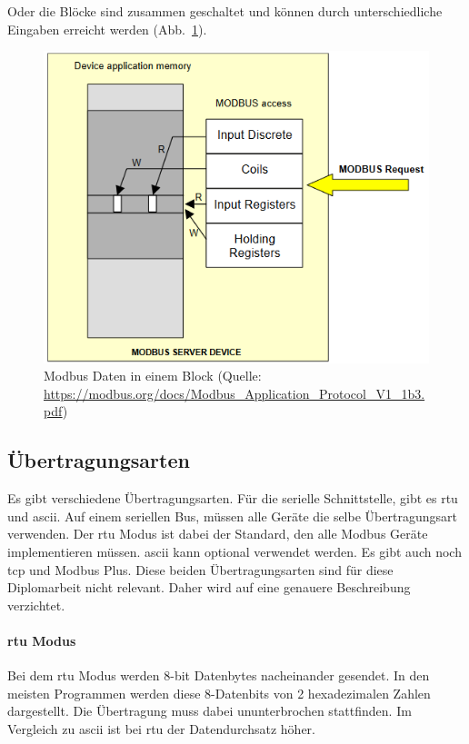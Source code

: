 Oder die Blöcke sind zusammen geschaltet und können durch unterschiedliche Eingaben erreicht werden (Abb.~\ref{fig:modbus_register_one_block}).
\begin{figure}[H]
	\centering
	\includegraphics[width=0.4\linewidth]{Bilder/Modbus_Data_Model_with_one_block}
	\caption{Modbus Daten in einem Block (Quelle: \url{https://modbus.org/docs/Modbus_Application_Protocol_V1_1b3.pdf})}
	\label{fig:modbus_register_one_block}
\end{figure}

\subsection{Übertragungsarten} \label{modbus_uebertragungsarten}
Es gibt verschiedene Übertragungsarten. Für die serielle Schnittstelle, gibt es \acf{rtu} und \acf{ascii}. Auf einem seriellen Bus, müssen alle Geräte die selbe Übertragungsart verwenden. Der \acs{rtu} Modus ist dabei der Standard, den alle Modbus Geräte implementieren müssen. \acs{ascii} kann optional verwendet werden. \newline Es gibt auch noch \acs{tcp} und Modbus Plus. Diese beiden Übertragungsarten sind für diese Diplomarbeit nicht relevant. Daher wird auf eine genauere Beschreibung verzichtet.

\paragraph{\acs{rtu} Modus}
Bei dem \acs{rtu} Modus werden 8-bit Datenbytes nacheinander gesendet. In den meisten Programmen werden diese 8-Datenbits von 2 hexadezimalen Zahlen dargestellt. Die Übertragung muss dabei ununterbrochen stattfinden. Im Vergleich zu \acs{ascii} ist bei \acs{rtu} der Datendurchsatz höher. 

